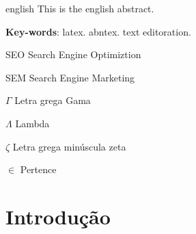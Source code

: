 \documentclass[
	12pt,				%
	openright,			%
	twoside,			%
	a4paper,			%
	english,			%
	french,				%
	spanish,			%
	brazil				%
	]{abntex2}
\begin{document}
\begin{resumo}[Abstract]
 \begin{otherlanguage*}{english}
   This is the english abstract.

   \vspace{\onelineskip}
 
   \noindent 
   \textbf{Key-words}: latex. abntex. text editoration.
 \end{otherlanguage*}
\end{resumo}

\listoffigures*
\cleardoublepage

\listoftables*
\cleardoublepage

\begin{siglas}
  \item[SEO] Search Engine Optimiztion
  \item[SEM] Search Engine Marketing
\end{siglas}

\begin{simbolos}
  \item[$ \Gamma $] Letra grega Gama
  \item[$ \Lambda $] Lambda
  \item[$ \zeta $] Letra grega minúscula zeta
  \item[$ \in $] Pertence
\end{simbolos}

\tableofcontents*
\cleardoublepage



\textual

\chapter*[Introdução]{Introdução}
\end{document}
